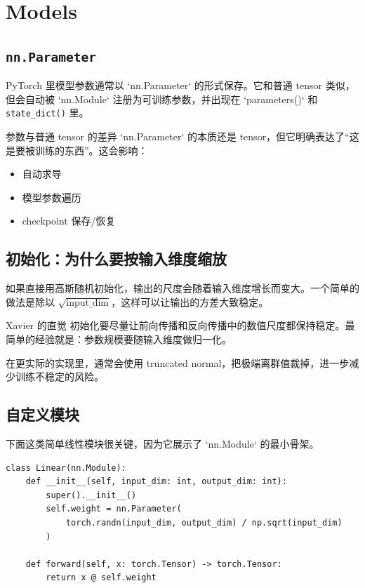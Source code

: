 \section{Models}

\subsection{\texttt{nn.Parameter}}

PyTorch 里模型参数通常以 `nn.Parameter` 的形式保存。它和普通 tensor 类似，但会自动被 `nn.Module` 注册为可训练参数，并出现在 `parameters()` 和 \texttt{state\_dict()} 里。

\begin{knowledgebox}{参数与普通 tensor 的差异}
`nn.Parameter` 的本质还是 tensor，但它明确表达了“这是要被训练的东西”。这会影响：
\begin{itemize}
    \item 自动求导
    \item 模型参数遍历
    \item checkpoint 保存/恢复
\end{itemize}
\end{knowledgebox}

\subsection{初始化：为什么要按输入维度缩放}

如果直接用高斯随机初始化，输出的尺度会随着输入维度增长而变大。一个简单的做法是除以 \(\sqrt{\text{input\_dim}}\)，这样可以让输出的方差大致稳定。

\begin{importantbox}{Xavier 的直觉}
初始化要尽量让前向传播和反向传播中的数值尺度都保持稳定。最简单的经验就是：参数规模要随输入维度做归一化。
\end{importantbox}

在更实际的实现里，通常会使用 truncated normal，把极端离群值裁掉，进一步减少训练不稳定的风险。

\subsection{自定义模块}

下面这类简单线性模块很关键，因为它展示了 `nn.Module` 的最小骨架。

\begin{lstlisting}
class Linear(nn.Module):
    def __init__(self, input_dim: int, output_dim: int):
        super().__init__()
        self.weight = nn.Parameter(
            torch.randn(input_dim, output_dim) / np.sqrt(input_dim)
        )

    def forward(self, x: torch.Tensor) -> torch.Tensor:
        return x @ self.weight
\end{lstlisting}

